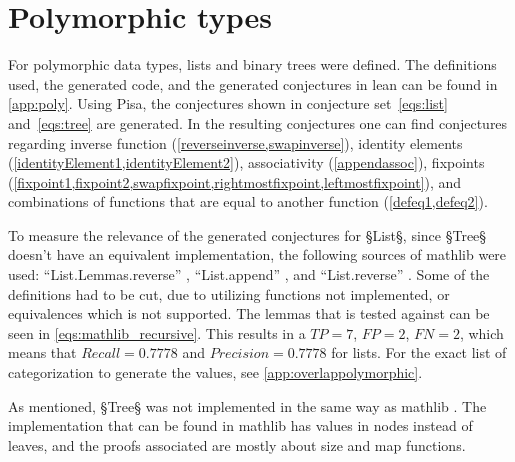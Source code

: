 \section{Polymorphic types}\label{sec:result:poly}
For polymorphic data types, lists and binary trees were defined.
The definitions used, the generated code, and the generated conjectures in lean can be found in \cref{app:poly}.
Using Pisa, the conjectures shown in conjecture set~\ref{eqs:list} and~\ref{eqs:tree} are generated. %
In the resulting conjectures one can find conjectures regarding inverse function (\cref{reverseinverse,swapinverse}), identity elements (\cref{identityElement1,identityElement2}), associativity (\cref{appendassoc}), fixpoints (\cref{fixpoint1,fixpoint2,swapfixpoint,rightmostfixpoint,leftmostfixpoint}), and combinations of functions that are equal to another function (\cref{defeq1,defeq2}).

To measure the relevance of the generated conjectures for §List§, since §Tree§ doesn't have an equivalent implementation, the following sources of mathlib were used: ``List.Lemmas.reverse'' \autocite{Lemmas.reverse}, ``List.append'' \autocite{List.append}, and ``List.reverse'' \autocite{List.reverse}.
Some of the definitions had to be cut, due to utilizing functions not implemented, or equivalences which is not supported.
The lemmas that is tested against can be seen in \cref{eqs:mathlib_recursive}.
This results in a $TP = 7$, $FP = 2$, $FN = 2$, which means that $Recall = 0.7778$ and $Precision = 0.7778$ for lists.
For the exact list of categorization to generate the values, see \cref{app:overlappolymorphic}.

As mentioned, §Tree§ was not implemented in the same way as mathlib \autocite{Tree}.
The implementation that can be found in mathlib has values in nodes instead of leaves, and the proofs associated are mostly about size and map functions.

